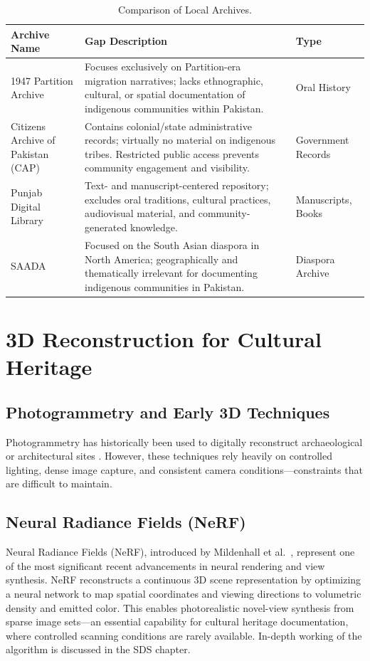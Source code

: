 \begin{table}[H]
\centering
\small
\begin{tabular}{p{3cm} p{8cm} p{2cm}}
\hline
\textbf{Archive Name} & \textbf{Gap Description} & \textbf{Type} \\
\hline

1947 Partition Archive & Focuses exclusively on Partition-era migration narratives; lacks ethnographic, cultural, or spatial documentation of indigenous communities within Pakistan. & Oral History \\

Citizens Archive of Pakistan (CAP) & Contains colonial/state administrative records; virtually no material on indigenous tribes. Restricted public access prevents community engagement and visibility. & Government Records \\


Punjab Digital Library & Text- and manuscript-centered repository; excludes oral traditions, cultural practices, audiovisual material, and community-generated knowledge. & Manuscripts, Books \\

SAADA & Focused on the South Asian diaspora in North America; geographically and thematically irrelevant for documenting indigenous communities in Pakistan. & Diaspora Archive \\


\hline
\end{tabular}
\caption{Comparison of Local Archives.}
\end{table}

\section{3D Reconstruction for Cultural Heritage}

\subsection{Photogrammetry and Early 3D Techniques}

Photogrammetry has historically been used to 
digitally reconstruct archaeological or architectural sites \cite{remondino2014}. 
However, these techniques rely heavily on controlled lighting, dense image capture, 
and consistent camera conditions—constraints that are difficult to maintain.

\subsection{Neural Radiance Fields (NeRF)}
Neural Radiance Fields (NeRF), introduced by Mildenhall et al.\ \cite{mildenhall2020}, represent one of the most significant recent advancements in neural rendering and view synthesis. NeRF reconstructs a continuous 3D scene representation by optimizing a neural network to map spatial coordinates and viewing directions to volumetric density and emitted color. This enables photorealistic novel-view synthesis from sparse image sets—an essential capability for cultural heritage documentation, where controlled scanning conditions are rarely available. 
In-depth working of the algorithm is discussed in the SDS chapter.


